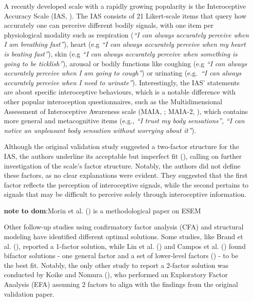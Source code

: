 \documentclass[
  man,
  floatsintext,
  longtable,
  nolmodern,
  notxfonts,
  notimes,
  colorlinks=true,linkcolor=blue,citecolor=blue,urlcolor=blue]{apa7}
\begin{document}
A recently developed scale with a rapidly growing popularity is the
Interoceptive Accuracy Scale (IAS, ). The IAS consists of 21 Likert-scale items that query how
accurately one can perceive different bodily signals, with one item per
physiological modality such as respiration (\emph{``I can always
accurately perceive when I am breathing fast''}), heart (e.g \emph{``I
can always accurately perceive when my heart is beating fast''}), skin
(e.g \emph{``I can always accurately perceive when something is going to
be ticklish''}), arousal or bodily functions like coughing (e.g
\emph{``I can always accurately perceive when I am going to cough''}) or
urinating (e.g.~\emph{``I can always accurately perceive when I need to
urinate''}). Interestingly, the IAS' statements are about specific
interoceptive behaviours, which is a notable difference with other
popular interoception questionnaires, such as the Multidimensional
Assessment of Interoceptive Awareness scale (MAIA,
; MAIA-2,
), which
contains more general and metacognitive items (e.g., \emph{``I trust my
body sensations''}, \emph{``I can notice an unpleasant body sensation
without worrying about it''}).

Although the original validation study suggested a two-factor structure
for the IAS, the authors underline its acceptable but imperfect fit
(), calling on
further investigation of the scale's factor structure. Notably, the
authors did not define these factors, as no clear explanations were
evident. They suggested that the first factor reflects the perception of
interoceptive signals, while the second pertains to signals that may be
difficult to perceive solely through interoceptive information.

\textbf{note to dom}:Morin et al. () is a
methodological paper on ESEM

Other follow-up studies using confirmatory factor analysis (CFA) and
structural modeling have identified different optimal solutions. Some
studies, like Brand et al. (), reported a
1-factor solution, while Lin et al. () and
Campos et al. () found bifactor solutions
- one general factor and a set of lower-level factors
() - to be
the best fit. Notably, the only other study to report a 2-factor
solution was conducted by Koike and Nomura
(), who performed an Exploratory Factor
Analysis (EFA) assuming 2 factors to align with the findings from the
original validation paper.
\end{document}
